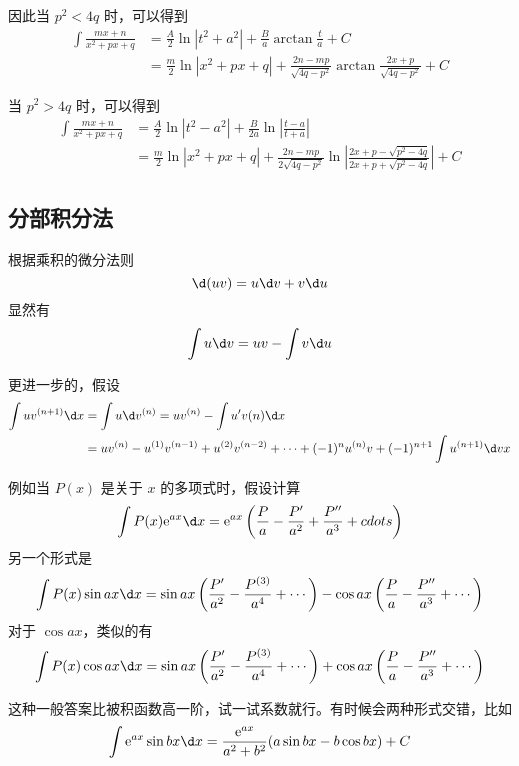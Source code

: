 因此当 $p^2<4q$ 时，可以得到
\[
	\begin{aligned}
		\int \frac{mx+n}{x^2+px+q} & = \frac{A}{2} \ln|t^2 + a^2| + \frac{B}{a}\arctan\frac{t}{a} + C                               \\
		                           & =\frac{m}{2}\ln|x^2+px+q| + \frac{2n-mp}{\sqrt{4q-p^2}}\arctan{\frac{2x+p}{\sqrt{4q-p^2}}} + C
	\end{aligned}
\]

当 $p^2>4q$ 时，可以得到
\[
	\begin{aligned}
		\int \frac{mx+n}{x^2+px+q} & = \frac{A}{2} \ln|t^2 - a^2| + \frac{B}{2a}\ln\left|\frac{t-a}{t+a}\right|                                                  \\
		                           & =\frac{m}{2}\ln|x^2+px+q| + \frac{2n-mp}{2\sqrt{4q-p^2}}\ln\left| \frac{2x+p-\sqrt{p^2-4q}}{2x+p+\sqrt{p^2-4q}} \right| + C
	\end{aligned}
\]

\subsection{分部积分法}

根据乘积的微分法则
\[ \d(uv) = u \d v + v \d u \]
显然有
\[ \int u \d v = uv - \int v \d u \]

更进一步的，假设
\[ \begin{aligned}
		\int u v^{(n+1)} \d x & = \int u \d v^{(n)} = uv^{(n)} - \int u' v(n) \d x                                                                 \\
		                      & = u v^{(n)} - u^{(1)} v^{(n-1)} + u^{(2)} v^{(n-2)} + \cdots + (-1)^n u^{(n)} v + (-1)^{n+1} \int u^{(n+1)} \d v x
	\end{aligned} \]

例如当 $P(x)$ 是关于 $x$ 的多项式时，假设计算
\[ \int P(x) \ee^{ax} \d x = \ee^{ax} \left( \frac{P}{a} - \frac{P'}{a^2} + \frac{P''}{a^3} + cdots \right) \]
另一个形式是
\[ \int P(x) \sin ax \d x = \sin ax \left( \frac{P'}{a^2} - \frac{P^{(3)}}{a^4} + \cdots  \right) - \cos ax \left( \frac{P}{a} - \frac{P''}{a^3} + \cdots \right) \]
对于 $\cos ax$，类似的有
\[ \int P(x) \cos ax \d x = \sin ax \left( \frac{P'}{a^2} - \frac{P^{(3)}}{a^4} + \cdots  \right) + \cos ax \left( \frac{P}{a} - \frac{P''}{a^3} + \cdots \right) \]

这种一般答案比被积函数高一阶，试一试系数就行。有时候会两种形式交错，比如
\[ \int \ee^{ax} \sin bx \d x = \frac{\ee^{ax}}{a^2+b^2} (a \sin bx - b \cos bx) + C\]


